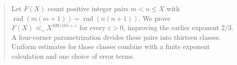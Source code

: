 \begin{abstract}
Let \(F(X)\) count positive integer pairs \(m<n\le X\) with
\(\operatorname{rad}(m(m+1))=\operatorname{rad}(n(n+1))\). We prove
\(F(X)\ll_\varepsilon X^{109/165+\varepsilon}\) for every
\(\varepsilon>0\), improving the earlier exponent \(2/3\). A four-corner
parametrization divides these pairs into thirteen classes. Uniform estimates
for those classes combine with a finite exponent calculation and one choice
of error terms.
\end{abstract}
